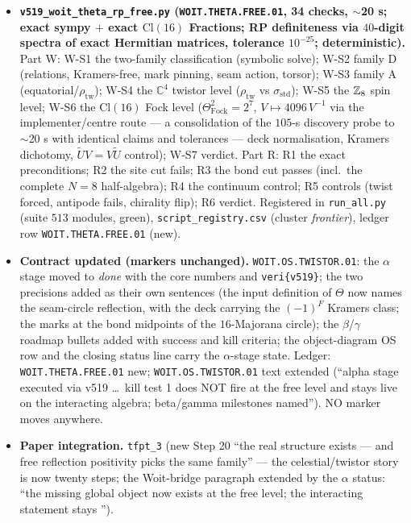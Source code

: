 \begin{itemize}[leftmargin=1.5em]
\item \textbf{\texttt{v519\_woit\_theta\_rp\_free.py} (\texttt{WOIT.THETA.FREE.01}, 34 checks,
$\sim$20 s; exact sympy $+$ exact $\mathrm{Cl}(16)$ Fractions; RP definiteness via $40$-digit
spectra of exact Hermitian matrices, tolerance $10^{-25}$; deterministic).} Part W: W-S1 the
two-family classification (symbolic solve); W-S2 family D (relations, Kramers-free, mark
pinning, seam action, torsor); W-S3 family A (equatorial/$\rho_{\mathrm{tw}}$); W-S4 the $\mathbb{C}^4$
twistor level ($\rho_{\mathrm{tw}}$ vs $\sigma_{\mathrm{std}}$); W-S5 the $\mathbb{Z}_8$ spin level;
W-S6 the $\mathrm{Cl}(16)$ Fock level ($\Theta_{\mathrm{Fock}}^2=2^7$, $V\mapsto4096\,V^{-1}$
via the implementer/centre route --- a consolidation of the $105$-s discovery probe to
$\sim$20 s with identical claims and tolerances --- deck normalisation, Kramers dichotomy,
$\tilde U V=V\tilde U$ control); W-S7 verdict. Part R: R1 the exact preconditions; R2 the site
cut fails; R3 the bond cut passes (incl.\ the complete $N=8$ half-algebra); R4 the continuum
control; R5 controls (twist forced, antipode fails, chirality flip); R6 verdict. Registered in
\texttt{run\_all.py} (suite $513$ modules, green), \texttt{script\_registry.csv} (cluster
\emph{frontier}), ledger row \texttt{WOIT.THETA.FREE.01} (new).
\item \textbf{Contract updated (markers unchanged).} \texttt{WOIT.OS.TWISTOR.01}: the $\alpha$
stage moved to \emph{done} with the core numbers and \texttt{veri\{v519\}}; the two precisions
added as their own sentences (the input definition of $\Theta$ now names the seam-circle
reflection, with the deck carrying the $(-1)^F$ Kramers class; the marks at the bond midpoints
of the $16$-Majorana circle); the $\beta$/$\gamma$ roadmap bullets added with success and kill
criteria; the object-diagram OS row and the closing status line carry the $\alpha$-stage state.
Ledger: \texttt{WOIT.THETA.FREE.01} new; \texttt{WOIT.OS.TWISTOR.01} text extended (``alpha
stage executed via v519 \dots\ kill test 1 does NOT fire at the free level and stays live on
the interacting algebra; beta/gamma milestones named''). NO marker moves anywhere.
\item \textbf{Paper integration.} \texttt{tfpt\_3} (new Step 20 ``the real structure exists ---
and free reflection positivity picks the same family'' --- the celestial/twistor story is now
twenty steps; the Woit-bridge paragraph extended by the $\alpha$ status: ``the missing global
object now exists at the free level; the interacting statement stays \mO'').

\end{itemize}
